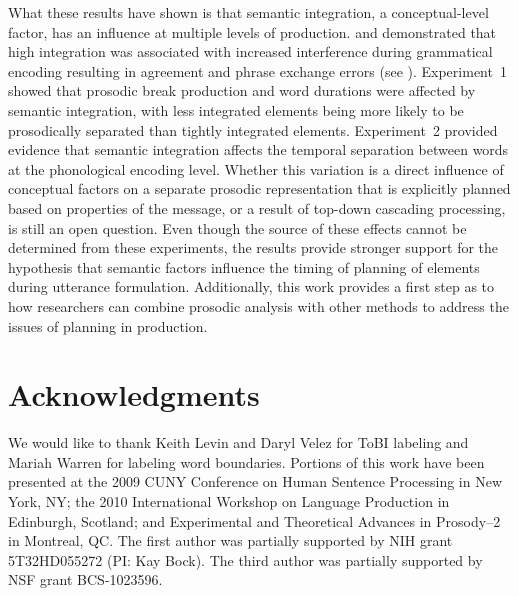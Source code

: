 \documentclass[12pt,titlepage]{article}
\newcommand{\IGNORE}[1]{} %
\begin{document}
What these results have shown is that semantic integration, a conceptual-level factor, has an influence at multiple levels of production.  and  demonstrated that high integration was associated with increased interference during grammatical encoding resulting in agreement and phrase exchange errors (see ). Experiment~1 showed that prosodic break production and word durations were affected by semantic integration, with less integrated elements being more likely to be prosodically separated than tightly integrated elements. Experiment~2 provided evidence that semantic integration affects the temporal separation between words at the phonological encoding level. Whether this variation is a direct influence of conceptual factors on a separate prosodic representation that is explicitly planned based on properties of the message\IGNORE{or phonological encoding}, or a result of top-down cascading processing, is still an open question.  Even though the source of these effects cannot be determined from these experiments, the results provide stronger support for the hypothesis that semantic factors influence the timing of planning of elements during utterance formulation. Additionally, this work provides a first step as to how researchers can combine prosodic analysis with other methods to address the issues of planning in production.


\newpage



\newpage
\section{Acknowledgments}
We would like to thank Keith Levin and Daryl Velez for ToBI labeling and Mariah Warren for labeling word boundaries. Portions of this work have been presented at the 2009 CUNY Conference on Human Sentence Processing in New York, NY; the 2010 International Workshop on Language Production in Edinburgh, Scotland; and Experimental and Theoretical Advances in Prosody--2 in Montreal, QC. The first author was partially supported by NIH grant 5T32HD055272 (PI: Kay Bock). The third author was partially supported by  NSF grant BCS-1023596.



\newpage

\IGNORE{TABLES}
\end{document}
